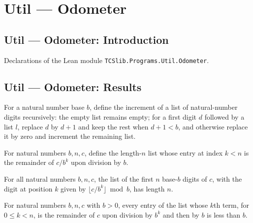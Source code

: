 \section{Util --- Odometer}
\subsection*{Util --- Odometer: Introduction}

Declarations of the Lean module \texttt{TCSlib.Programs.Util.Odometer}.

\subsection*{Util --- Odometer: Results}

\begin{definition}
\label{Light.incDigits}
\leanok
For a natural number base $b$, define the increment of a list of natural-number digits
recursively: the empty list remains empty; for a first digit $d$ followed by a list $l$,
replace $d$ by $d+1$ and keep the rest when $d+1<b$, and otherwise replace it by zero
and increment the remaining list.
\end{definition}

\begin{definition}
\label{Light.digitsLE}
\leanok
For natural numbers $b,n,c$, define the length-$n$ list whose entry at index $k<n$ is
the remainder of $c/b^k$ upon division by $b$.
\end{definition}

\begin{theorem}
\label{Light.length_digitsLE}
\leanok
{}
For all natural numbers $b,n,c$, the list of the first $n$ base-$b$ digits of $c$, with
the digit at position $k$ given by $\lfloor c/b^k\rfloor\bmod b$, has length $n$.
\end{theorem}

\begin{theorem}
\label{Light.lt_of_mem_digitsLE}
\leanok
{}
For natural numbers $b,n,c$ with $b>0$, every entry of the list whose $k$th term, for
$0\le k<n$, is the remainder of $c$ upon division by $b^k$ and then by $b$ is less than
$b$.
\end{theorem}

